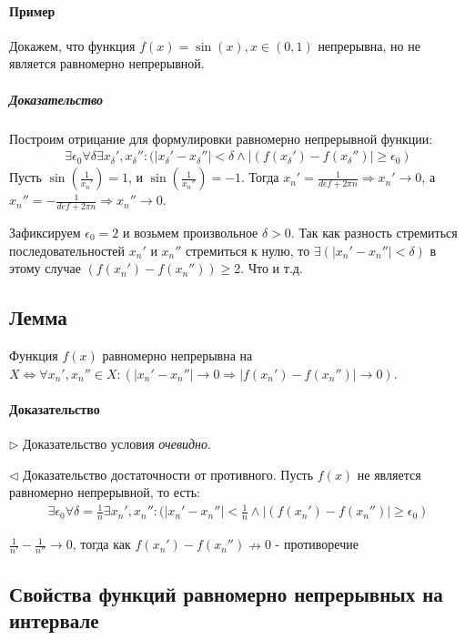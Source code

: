 \documentclass[10pt]{article}
\newcommand{\pihalf}{def}
\begin{document}
		\paragraph{Пример}
		Докажем, что функция $f(x) = \sin(x), x \in (0,1)$ непрерывна, но не является равномерно непрерывной.
			\subparagraph{Доказательство}
			Построим отрицание для формулировки равномерно непрерывной функции:
			\begin{eqnarray}
				\nonumber \exists \epsilon_0 \forall \delta \exists x_\delta', x_\delta'' : (|x_\delta' - x_\delta''| < \delta \wedge |(f(x_\delta') - f(x_\delta'')| \geq \epsilon_0)
			\end{eqnarray}
			Пусть $\sin(\frac{1}{x_n'}) = 1$, и $\sin(\frac{1}{x_n''}) = -1$. Тогда $x_n' = \frac{1}{\pihalf + 2\pi n} \Rightarrow x_n' \to 0$, а $x_n'' = -\frac{1}{\pihalf + 2\pi n} \Rightarrow x_n'' \to 0$.
			
			Зафиксируем $\epsilon_0 = 2$ и возьмем произвольное $\delta > 0$. Так как разность стремиться последовательностей $x_n'$ и $x_n''$ стремиться к нулю, то $\exists (|x_n' - x_n''| < \delta)$ в этому случае $(f(x_n') - f(x_n'')) \geq 2$. Что и т.д.
			
		\subsection{Лемма}
		Функция $f(x)$ равномерно непрерывна на $X \Leftrightarrow \forall x_n', x_n'' \in X : (|x_n' - x_n''| \to 0 \Rightarrow |f(x_n') - f(x_n'')| \to 0)$.
		\paragraph{Доказательство}
		$\rhd$ Доказательство условия \textit{очевидно}.
		
		$\lhd$ Доказательство достаточности от противного. Пусть $f(x)$ не является равномерно непрерывной, то есть:
		\begin{eqnarray}
			\nonumber \exists \epsilon_0 \forall \delta = \frac{1}{n} \exists x_n', x_n'' : (|x_n' - x_n''| < \frac{1}{n} \wedge |(f(x_n') - f(x_n'')| \geq \epsilon_0)
		\end{eqnarray}
		
		$\frac{1}{n'} - \frac{1}{n''} \to 0$, тогда как $f(x_n') - f(x_n'') \nrightarrow 0$ - противоречие
		
		\subsection{Свойства функций равномерно непрерывных на интервале}
\end{document}
